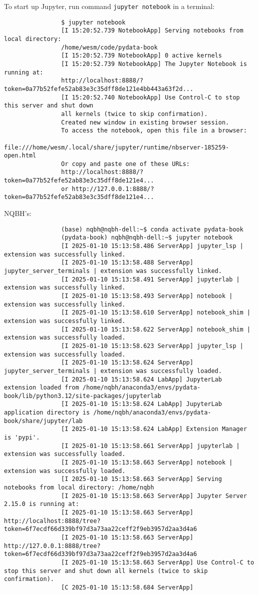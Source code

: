 \documentclass{article}
\begin{document}
\begin{itemize}
\begin{itemize}
\begin{itemize}
			To start up Jupyter, run command {\tt jupyter notebook} in a terminal:
			\begin{verbatim}
				$ jupyter notebook
				[I 15:20:52.739 NotebookApp] Serving notebooks from local directory:
				/home/wesm/code/pydata-book
				[I 15:20:52.739 NotebookApp] 0 active kernels
				[I 15:20:52.739 NotebookApp] The Jupyter Notebook is running at:
				http://localhost:8888/?token=0a77b52fefe52ab83e3c35dff8de121e4bb443a63f2d...
				[I 15:20:52.740 NotebookApp] Use Control-C to stop this server and shut down
				all kernels (twice to skip confirmation).
				Created new window in existing browser session.
				To access the notebook, open this file in a browser:
				file:///home/wesm/.local/share/jupyter/runtime/nbserver-185259-open.html
				Or copy and paste one of these URLs:
				http://localhost:8888/?token=0a77b52fefe52ab83e3c35dff8de121e4...
				or http://127.0.0.1:8888/?token=0a77b52fefe52ab83e3c35dff8de121e4...
			\end{verbatim}
			NQBH's:
			\begin{verbatim}
				(base) nqbh@nqbh-dell:~$ conda activate pydata-book
				(pydata-book) nqbh@nqbh-dell:~$ jupyter notebook
				[I 2025-01-10 15:13:58.486 ServerApp] jupyter_lsp | extension was successfully linked.
				[I 2025-01-10 15:13:58.488 ServerApp] jupyter_server_terminals | extension was successfully linked.
				[I 2025-01-10 15:13:58.491 ServerApp] jupyterlab | extension was successfully linked.
				[I 2025-01-10 15:13:58.493 ServerApp] notebook | extension was successfully linked.
				[I 2025-01-10 15:13:58.610 ServerApp] notebook_shim | extension was successfully linked.
				[I 2025-01-10 15:13:58.622 ServerApp] notebook_shim | extension was successfully loaded.
				[I 2025-01-10 15:13:58.623 ServerApp] jupyter_lsp | extension was successfully loaded.
				[I 2025-01-10 15:13:58.624 ServerApp] jupyter_server_terminals | extension was successfully loaded.
				[I 2025-01-10 15:13:58.624 LabApp] JupyterLab extension loaded from /home/nqbh/anaconda3/envs/pydata-book/lib/python3.12/site-packages/jupyterlab
				[I 2025-01-10 15:13:58.624 LabApp] JupyterLab application directory is /home/nqbh/anaconda3/envs/pydata-book/share/jupyter/lab
				[I 2025-01-10 15:13:58.624 LabApp] Extension Manager is 'pypi'.
				[I 2025-01-10 15:13:58.661 ServerApp] jupyterlab | extension was successfully loaded.
				[I 2025-01-10 15:13:58.663 ServerApp] notebook | extension was successfully loaded.
				[I 2025-01-10 15:13:58.663 ServerApp] Serving notebooks from local directory: /home/nqbh
				[I 2025-01-10 15:13:58.663 ServerApp] Jupyter Server 2.15.0 is running at:
				[I 2025-01-10 15:13:58.663 ServerApp] http://localhost:8888/tree?token=6f7ecdf66d339bf97d3a73aa22ceff2f9eb3957d2aa3d4a6
				[I 2025-01-10 15:13:58.663 ServerApp]     http://127.0.0.1:8888/tree?token=6f7ecdf66d339bf97d3a73aa22ceff2f9eb3957d2aa3d4a6
				[I 2025-01-10 15:13:58.663 ServerApp] Use Control-C to stop this server and shut down all kernels (twice to skip confirmation).
				[C 2025-01-10 15:13:58.684 ServerApp] 
				

\end{verbatim}
\end{itemize}
\end{itemize}
\end{itemize}
\end{document}
